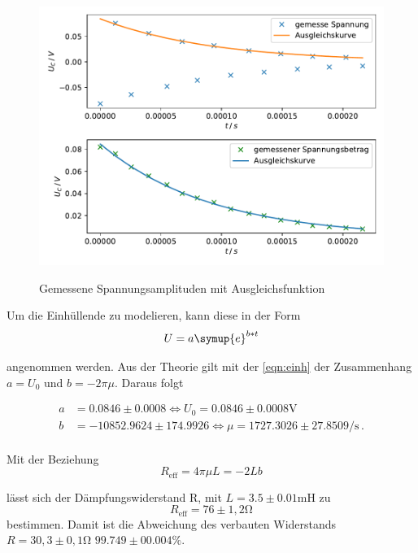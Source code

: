 \newpage
\begin{figure}
    \centering
    \includegraphics{Daten/a.pdf}
    \label{fig:1}
    \caption{Gemessene Spannungsamplituden mit Ausgleichsfunktion}
\end{figure}

Um die Einhüllende zu modelieren, kann diese in der Form
\begin{equation}
    U = a \symup{e}^{b*t}
\end{equation}

\noindent
angenommen werden. Aus der Theorie gilt mit der \autoref{eqn:einh} der Zusammenhang $a = U_0$ und $b = -2 \pi \mu$. Daraus folgt %


\begin{align*}
    a &= 0.0846 \pm 0.0008 \Leftrightarrow U_0 = 0.0846 \pm 0.0008 \si{\volt} \\
    b &= -10852.9624 \pm 174.9926 \Leftrightarrow \mu = 1727.3026 \pm 27.8509 \si{\per\second} \, .\\
\end{align*}

\noindent
Mit der Beziehung 
\begin{equation}
    R_\text{eff} = 4\pi\mu L = -2 L b
\end{equation}

\noindent
lässt sich der Dämpfungswiderstand R, mit $L = 3.5 \pm 0.01 \si{\milli\henry}$ zu
\begin{equation*}
    R_\text{eff} = 76 \pm 1,2 \si{\ohm}
\end{equation*}
bestimmen. Damit ist die Abweichung des verbauten Widerstands $R = 30,3 \pm 0,1 \si{\ohm}$ $99.749 \pm 00.004 \si{\percent}$.

